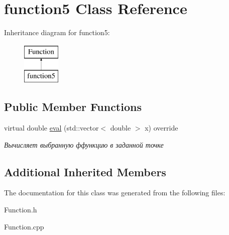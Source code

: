 \hypertarget{classfunction5}{}\section{function5 Class Reference}
\label{classfunction5}
Inheritance diagram for function5\+:\begin{figure}[H]
\begin{center}
\leavevmode
\includegraphics[height=2.000000cm]{classfunction5}
\end{center}
\end{figure}
\subsection*{Public Member Functions}
\begin{DoxyCompactItemize}
\item 
\mbox{\label{classfunction5_a3710d7f05bce2203088b8bdd15916dcc}} 
virtual double \mbox{\hyperlink{classfunction5_a3710d7f05bce2203088b8bdd15916dcc}{eval}} (std\+::vector$<$ double $>$ x) override
\begin{DoxyCompactList}\small\item\em Вычисляет выбранную ффункцию в заданной точке \end{DoxyCompactList}\end{DoxyCompactItemize}
\subsection*{Additional Inherited Members}


The documentation for this class was generated from the following files\+:\begin{DoxyCompactItemize}
\item 
Function.\+h\item 
Function.\+cpp\end{DoxyCompactItemize}
